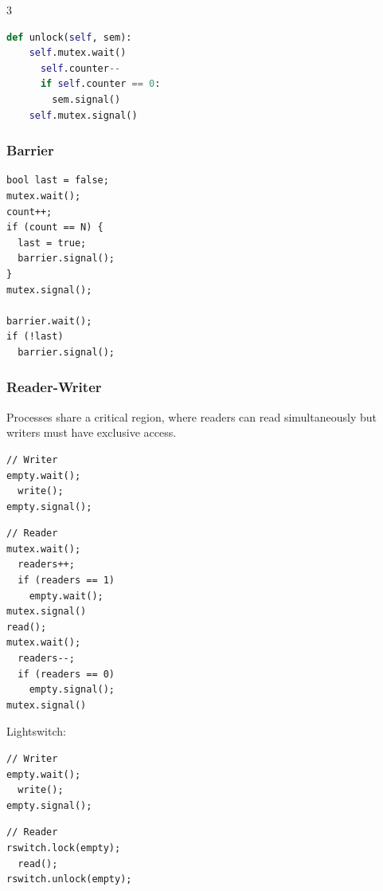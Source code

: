 \documentclass[12pt, a4paper]{article}
\begin{document}
\begin{multicols*}{3}
\begin{minipage}{0.45\columnwidth}
\begin{lstlisting}[language=Python,basicstyle=\ttfamily\tiny]
  def unlock(self, sem):
    self.mutex.wait()
      self.counter--
      if self.counter == 0:
        sem.signal()
    self.mutex.signal()
  \end{lstlisting}
\end{minipage}
\begin{minipage}{0.5\columnwidth}
\subsubsection{Barrier}
  \begin{lstlisting}
bool last = false;
mutex.wait();
count++;
if (count == N) {
  last = true;
  barrier.signal(); 
}
mutex.signal();

barrier.wait();
if (!last) 
  barrier.signal();
  \end{lstlisting}
\end{minipage}

\colbreak
\subsubsection{Reader-Writer}
Processes share a critical region, where readers can read simultaneously but writers must have exclusive access.
\vspace{-1em}
\begin{minipage}{0.45\columnwidth}
  \begin{lstlisting}
// Writer
empty.wait();
  write();
empty.signal();
  \end{lstlisting}
\end{minipage}
\begin{minipage}{0.5\columnwidth}
  \begin{lstlisting}
// Reader 
mutex.wait();
  readers++;
  if (readers == 1)
    empty.wait();
mutex.signal()
read();
mutex.wait();
  readers--;
  if (readers == 0)
    empty.signal();
mutex.signal()
  \end{lstlisting}
\end{minipage}

Lightswitch:\\
\begin{minipage}{0.45\columnwidth}
  \begin{lstlisting}
// Writer
empty.wait();
  write();
empty.signal();
  \end{lstlisting}
\end{minipage}
\begin{minipage}{0.5\columnwidth}
  \begin{lstlisting}
// Reader 
rswitch.lock(empty);
  read();
rswitch.unlock(empty);
  \end{lstlisting}
\end{minipage}


\end{multicols*}
\end{document}
